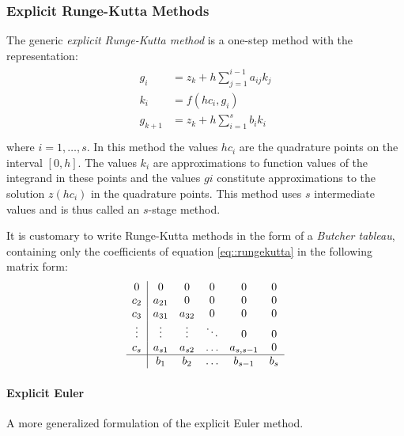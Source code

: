 \subsubsection{Explicit Runge-Kutta Methods}
The generic \textit{explicit Runge-Kutta method} is a one-step method with the representation:
\begin{equation}
	\begin{split}
	\begin{aligned}
		g_i &= z_k + h\sum_{j=1}^{i-1}a_{ij}k_j \\
		k_i &= f(hc_i,g_i) \\
		g_{k+1} &= z_k + h\sum_{i=1}^{s}b_ik_i \\
	\end{aligned}
	\end{split}
	\label{eq::rungekutta_explicit}
\end{equation}
where $i=1,\dots,s$. In this method the values $hc_i$ are the quadrature points on the interval $[0, h]$. The values $k_i$ are approximations to function values of the integrand in these points and the values $g i$ constitute approximations to the solution $z(hc_i)$ in the quadrature points. This method uses $s$ intermediate values and is thus called an $s$-stage method.

\begin{definition}
	It is customary to write Runge-Kutta methods in the form of a \textit{Butcher tableau}, containing only the coefficients of equation \ref{eq::rungekutta} in the following matrix form:
	\begin{equation}
		\begin{array}
			{c|ccccc}
			0      &  0     & 0      & 0      & 0         & 0 \\
			c_2    & a_{21} & 0      & 0      & 0         & 0 \\
			c_3    & a_{31} & a_{32} & 0      & 0         & 0 \\
			\vdots & \vdots & \vdots & \ddots & 0         & 0 \\
			c_s    & a_{s1} & a_{s2} & \ldots & a_{s,s-1} & 0 \\ \hline
			       & b_1    & b_2    & \ldots & b_{s-1}   & b_s
		\end{array}
	\end{equation}
\end{definition}

\paragraph{Explicit Euler}
A more generalized formulation of the explicit Euler method.

